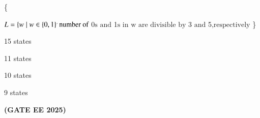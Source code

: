 \documentclass[journal,12pt,onecolumn]{IEEEtran}
\theoremstyle{remark}
\begin{document}
\begin {center}
\begin{enumerate}
        
 

      
  
      
\{
      
 
$L=\{w\mid w \in  \left\{0,1\right\} ^ . \text{number of }  $0$\text{s and }$1$\text{s in w are divisible by } $3$ \text{ and } $5$\text{,respectively}$
 \}
      
  
  
    \begin{enumerate}
\begin{multicols}{4}
        
    
        \item 15 states 
        \item 11 states 
        \item 10 states
        \item 9 states 
        \end{multicols}
    \end{enumerate}
    \hfill \textbf{(GATE EE 2025)}
   

\end{enumerate}
\end{center}
\end{document}
